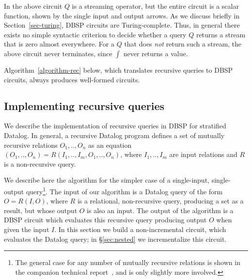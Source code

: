 \documentclass[twocolumn
]{svjour3}
\numberwithin{equation}{section}
\newcommand{\dbsp}{DBSP\xspace}
\newcommand{\secref}[1]{\S\ref{#1}}  %
\newcommand{\refsec}[1]{\secref{#1}}
\begin{document}
\begin{center}
\end{center}

In the above circuit $Q$ is a streaming operator, but the entire
circuit is a scalar function, shown by the single input and output
arrows.  As we discuss briefly in Section~\ref{sec-turing}, \dbsp
circuits are Turing-complete.  Thus, in general there exists no simple
syntactic criterion to decide whether a query $Q$ returns a stream
that is zero almost everywhere.  For a $Q$ that does \emph{not} return
such a stream, the above circuit never terminates, since $\int$ never
returns a value.

Algorithm~\ref{algorithm-rec} below, which translates recursive queries to
\dbsp circuits, always produces well-formed circuits.

\vspace{-3ex}
\subsection{Implementing recursive queries}\label{sec:datalog}

We describe the implementation of recursive queries in \dbsp for
stratified Datalog.
In general, a recursive Datalog program defines a set of
mutually recursive relations $O_1,..,O_n$ as an equation
$(O_1,..,O_n)=R(I_1,..,I_m, O_1,..,O_n)$, where $I_1,..,I_m$ are
input relations and $R$ is a non-recursive query.

We describe here the algorithm for the simpler case of a single-input,
single-output query\footnote{The general case for any number of
mutually recursive relations is shown in the companion technical
report~\cite{tr}, and is only slightly more involved.}.  The input of
our algorithm is a Datalog query of the form $O = R(I, O)$, where $R$
is a relational, non-recursive query, producing a set as a result, but
whose output $O$ is also an input.  The output of the algorithm is a
\dbsp circuit which evaluates this recursive query producing output
$O$ when given the input $I$.  In this section we build a
non-incremental circuit, which evaluates the Datalog query; in
\refsec{sec:nested} we incrementalize this circuit.
\end{document}
